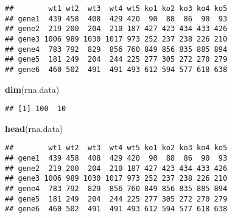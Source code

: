 \documentclass[
]{article}
\newenvironment{Shaded}{\begin{snugshade}}{\end{snugshade}}
\newcommand{\CommentTok}[1]{\textcolor[rgb]{0.56,0.35,0.01}{\textit{#1}}}
\newcommand{\DataTypeTok}[1]{\textcolor[rgb]{0.13,0.29,0.53}{#1}}
\newcommand{\DecValTok}[1]{\textcolor[rgb]{0.00,0.00,0.81}{#1}}
\newcommand{\KeywordTok}[1]{\textcolor[rgb]{0.13,0.29,0.53}{\textbf{#1}}}
\newcommand{\NormalTok}[1]{#1}
\newcommand{\OperatorTok}[1]{\textcolor[rgb]{0.81,0.36,0.00}{\textbf{#1}}}
\newcommand{\OtherTok}[1]{\textcolor[rgb]{0.56,0.35,0.01}{#1}}
\newcommand{\StringTok}[1]{\textcolor[rgb]{0.31,0.60,0.02}{#1}}
\begin{document}
\begin{verbatim}
##        wt1 wt2  wt3  wt4 wt5 ko1 ko2 ko3 ko4 ko5
## gene1  439 458  408  429 420  90  88  86  90  93
## gene2  219 200  204  210 187 427 423 434 433 426
## gene3 1006 989 1030 1017 973 252 237 238 226 210
## gene4  783 792  829  856 760 849 856 835 885 894
## gene5  181 249  204  244 225 277 305 272 270 279
## gene6  460 502  491  491 493 612 594 577 618 638
\end{verbatim}

\begin{Shaded}
\begin{Highlighting}[]
\KeywordTok{dim}\NormalTok{(rna.data)}
\end{Highlighting}
\end{Shaded}

\begin{verbatim}
## [1] 100  10
\end{verbatim}

\begin{Shaded}
\begin{Highlighting}[]
\KeywordTok{head}\NormalTok{(rna.data)}
\end{Highlighting}
\end{Shaded}

\begin{verbatim}
##        wt1 wt2  wt3  wt4 wt5 ko1 ko2 ko3 ko4 ko5
## gene1  439 458  408  429 420  90  88  86  90  93
## gene2  219 200  204  210 187 427 423 434 433 426
## gene3 1006 989 1030 1017 973 252 237 238 226 210
## gene4  783 792  829  856 760 849 856 835 885 894
## gene5  181 249  204  244 225 277 305 272 270 279
## gene6  460 502  491  491 493 612 594 577 618 638
\end{verbatim}

\begin{Shaded}
\end{Shaded}
\end{document}

